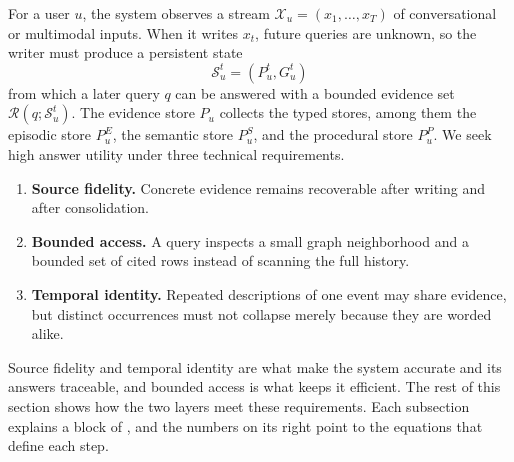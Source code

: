 For a user \(u\), the system observes a stream
\(\mathcal X_u=(x_1,\ldots,x_T)\) of conversational or multimodal inputs. When it
writes \(x_t\), future queries are unknown, so the writer must produce a
persistent state
\begin{equation}
    \mathcal S_u^t=(P_u^t,G_u^t)
\end{equation}
from which a later query \(q\) can be answered with a bounded evidence set
\(\mathcal R(q;\mathcal S_u^t)\). The evidence store \(P_u\) collects the typed
stores, among them the episodic store \(P_u^E\), the semantic store \(P_u^S\),
and the procedural store \(P_u^P\). We seek high answer utility under three
technical requirements.
\begin{enumerate}[leftmargin=*,nosep]
    \item \textbf{Source fidelity.} Concrete evidence remains recoverable after
    writing and after consolidation.
    \item \textbf{Bounded access.} A query inspects a small graph neighborhood
    and a bounded set of cited rows instead of scanning the full history.
    \item \textbf{Temporal identity.} Repeated descriptions of one event may
    share evidence, but distinct occurrences must not collapse merely because
    they are worded alike.
\end{enumerate}
Source fidelity and temporal identity are what make the system accurate and
its answers traceable, and bounded access is what keeps it efficient. The rest
of this section shows how the two layers meet these requirements.
Each subsection explains a block of , and the numbers on its right
point to the equations that define each step.

